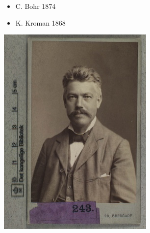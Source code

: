\documentclass{beamer}
\begin{document}
\begin{frame}{28}
\begin{itemize}
  \item C. Bohr 1874
  \item K. Kroman 1868
\end{itemize}
\includegraphics[width=0.9\linewidth]{slide28_img10.jpg}

\end{frame}
\end{document}
